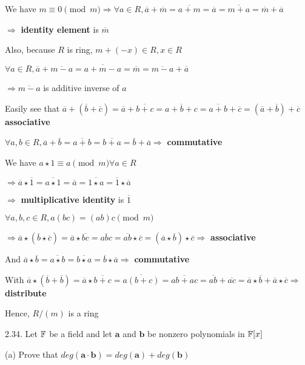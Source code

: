 We have $m \equiv 0 \pmod m \Rightarrow \forall a \in R, \overline{a} + \overline{m} = \overline{a+m} = \overline{a} = \overline{m+a} = \overline{m} + \overline{a}$

$\Rightarrow$ \textbf{identity element} is $\overline{m}$

Also, because $R$ is ring, $m+(-x) \in R, x \in R$

$\forall a \in R, \overline{a} + \overline{m-a} = \overline{a + m - a} = \overline{m} = \overline{m-a} + \overline{a}$

$\Rightarrow \overline{m-a}$ is additive inverse of $a$

Easily see that $\overline{a} + (\overline{b}+\overline{c}) = \overline{a} + \overline{b+c} = \overline{a+b+c} = \overline{a+b} + \overline{c} = (\overline{a}+\overline{b})+\overline{c}$ \textbf{associative}

$\forall a, b \in R, \overline{a}+\overline{b}=\overline{a+b}=\overline{b+a}=\overline{b}+\overline{a} \Rightarrow$  \textbf{commutative} 

We have $a \star 1 \equiv a \pmod m \forall a \in R$

$\Rightarrow \overline{a} \star \overline{1} = \overline{a \star 1} = \overline{a} = \overline{1 \star a} = \overline{1} \star \overline{a}$

$\Rightarrow$ \textbf{multiplicative identity} is $\overline{1}$

$\forall a, b, c \in R, a(bc)=(ab)c \pmod m$

$\Rightarrow \overline{a} \star (\overline{b} \star \overline{c}) = \overline{a} \star \overline{bc} = \overline{abc} = \overline{ab} \star \overline{c} = (\overline{a} \star \overline{b}) \star \overline{c} \Rightarrow$ \textbf{associative}

And $\overline{a} \star \overline{b} = \overline{a \star b} = \overline{b \star a} = \overline{b} \star \overline{a} \Rightarrow$ \textbf{commutative}

With $\overline{a} \star (\overline{b} + \overline{b}) = \overline{a} \star \overline{b + c} = \overline{a(b+c)} = \overline{ab + ac} = \overline{ab} + \overline{ac} = \overline{a} \star \overline{b} + \overline{a} \star \overline{c} \Rightarrow$ \textbf{distribute}

Hence, $R/(m)$ is a ring


2.34. Let $\mathbb{F}$ be a field and let $\mathbf{a}$ and $\mathbf{b}$ be nonzero polynomials in $\mathbb{F}[x]$

(a) Prove that $deg(\textbf{a} \cdot \textbf{b}) = deg(\textbf{a}) + deg(\textbf{b})$
    

